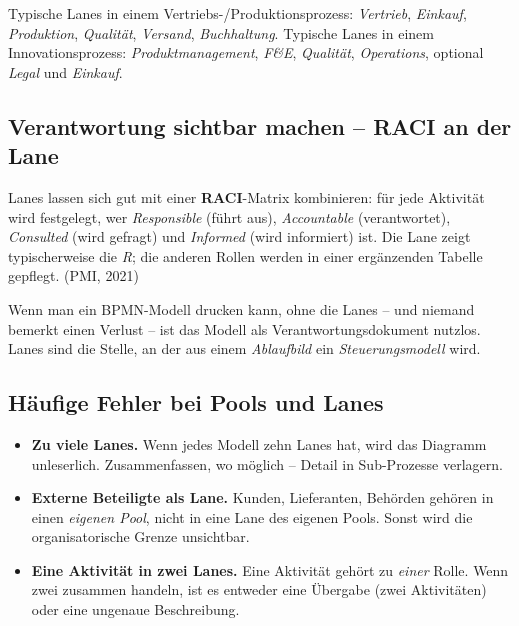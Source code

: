 \documentclass[11pt,a4paper,oneside]{article}
\newcommand{\fachbegriff}[1]{\textbf{#1}}
\newcommand{\quelle}[1]{{\footnotesize\color{lpGray}(#1)}}
\begin{document}
Typische Lanes in einem Vertriebs-/Produktionsprozess: \emph{Vertrieb}, \emph{Einkauf}, \emph{Produktion}, \emph{Qualität}, \emph{Versand}, \emph{Buchhaltung}. Typische Lanes in einem Innovationsprozess: \emph{Produktmanagement}, \emph{F\&E}, \emph{Qualität}, \emph{Operations}, optional \emph{Legal} und \emph{Einkauf}.

\subsection{Verantwortung sichtbar machen -- RACI an der Lane}

Lanes lassen sich gut mit einer \fachbegriff{RACI}-Matrix kombinieren: für jede Aktivität wird festgelegt, wer \emph{Responsible} (führt aus), \emph{Accountable} (verantwortet), \emph{Consulted} (wird gefragt) und \emph{Informed} (wird informiert) ist. Die Lane zeigt typischerweise die \emph{R}; die anderen Rollen werden in einer ergänzenden Tabelle gepflegt. \quelle{PMI, 2021}

\begin{merkbox}
Wenn man ein BPMN-Modell drucken kann, ohne die Lanes -- und niemand bemerkt einen Verlust -- ist das Modell als Verantwortungsdokument nutzlos. Lanes sind die Stelle, an der aus einem \emph{Ablaufbild} ein \emph{Steuerungsmodell} wird.
\end{merkbox}

\subsection{Häufige Fehler bei Pools und Lanes}

\begin{itemize}
  \item \textbf{Zu viele Lanes.} Wenn jedes Modell zehn Lanes hat, wird das Diagramm unleserlich. Zusammenfassen, wo möglich -- Detail in Sub-Prozesse verlagern.
  \item \textbf{Externe Beteiligte als Lane.} Kunden, Lieferanten, Behörden gehören in einen \emph{eigenen Pool}, nicht in eine Lane des eigenen Pools. Sonst wird die organisatorische Grenze unsichtbar.
  \item \textbf{Eine Aktivität in zwei Lanes.} Eine Aktivität gehört zu \emph{einer} Rolle. Wenn zwei zusammen handeln, ist es entweder eine Übergabe (zwei Aktivitäten) oder eine ungenaue Beschreibung.
\end{itemize}

\end{document}
